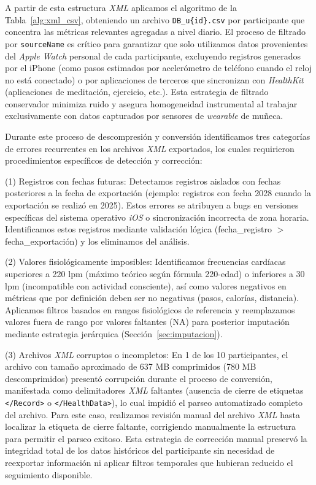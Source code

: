 \FloatBarrier
\setlength{\parindent}{1.27cm}

A partir de esta estructura \textit{XML} aplicamos el algoritmo de la Tabla~\ref{alg:xml_csv}, obteniendo un archivo \texttt{DB\_u\{id\}.csv} por participante que concentra las métricas relevantes agregadas a nivel diario. El proceso de filtrado por \texttt{sourceName} es crítico para garantizar que solo utilizamos datos provenientes del \textit{Apple Watch} personal de cada participante, excluyendo registros generados por el iPhone (como pasos estimados por acelerómetro de teléfono cuando el reloj no está conectado) o por aplicaciones de terceros que sincronizan con \textit{HealthKit} (aplicaciones de meditación, ejercicio, etc.). Esta estrategia de filtrado conservador minimiza ruido y asegura homogeneidad instrumental al trabajar exclusivamente con datos capturados por sensores de \textit{wearable} de muñeca.

Durante este proceso de descompresión y conversión identificamos tres categorías de errores recurrentes en los archivos \textit{XML} exportados, los cuales requirieron procedimientos específicos de detección y corrección:

(1) Registros con fechas futuras: Detectamos registros aislados con fechas posteriores a la fecha de exportación (ejemplo: registros con fecha 2028 cuando la exportación se realizó en 2025). Estos errores se atribuyen a bugs en versiones específicas del sistema operativo \textit{iOS} o sincronización incorrecta de zona horaria. Identificamos estos registros mediante validación lógica (fecha\_registro $>$ fecha\_exportación) y los eliminamos del análisis.

(2) Valores fisiológicamente imposibles: Identificamos frecuencias cardíacas superiores a 220 lpm (máximo teórico según fórmula 220-edad) o inferiores a 30 lpm (incompatible con actividad consciente), así como valores negativos en métricas que por definición deben ser no negativas (pasos, calorías, distancia). Aplicamos filtros basados en rangos fisiológicos de referencia \cite{Riebe2018ACSM} y reemplazamos valores fuera de rango por valores faltantes (NA) para posterior imputación mediante estrategia jerárquica (Sección~\ref{sec:imputacion}).

(3) Archivos \textit{XML} corruptos o incompletos: En 1 de los 10 participantes, el archivo  con tamaño aproximado de 637 MB comprimidos (780 MB descomprimidos) presentó corrupción durante el proceso de conversión, manifestada como delimitadores \textit{XML} faltantes (ausencia de cierre de etiquetas \texttt{</Record>} o \texttt{</HealthData>}), lo cual impidió el parseo automatizado completo del archivo. Para este caso, realizamos revisión manual del archivo \textit{XML} hasta localizar la etiqueta de cierre faltante, corrigiendo manualmente la estructura para permitir el parseo exitoso. Esta estrategia de corrección manual preservó la integridad total de los datos históricos del participante sin necesidad de reexportar información ni aplicar filtros temporales que hubieran reducido el seguimiento disponible.

